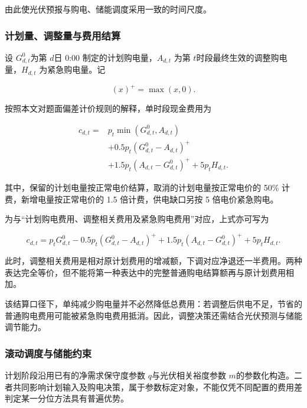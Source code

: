 \documentclass[withoutpreface,bwprint]{cumcmthesis}
\begin{document}
由此使光伏预报与购电、储能调度采用一致的时间尺度。

\subsubsection{计划量、调整量与费用结算}

设 \(G_{d,t}^{0}\)为第 \(d\)日 0:00 制定的计划购电量，\(A_{d,t}\) 为第
\(t\)时段最终生效的调整购电量，\(H_{d,t}\) 为紧急购电量。记

\begin{equation}(x)^{+} = \max\left( x,0 \right).\end{equation}

按照本文对题面偏差计价规则的解释，单时段现金费用为

\begin{equation}\begin{aligned}
c_{d,t} = & p_{t}\min\left( G_{d,t}^{0},A_{d,t} \right) \\
 & + 0.5p_{t}\left( G_{d,t}^{0} - A_{d,t} \right)^{+} \\
 & + 1.5p_{t}\left( A_{d,t} - G_{d,t}^{0} \right)^{+} + 5p_{t}H_{d,t}.
\end{aligned}\end{equation}

其中，保留的计划电量按正常电价结算，取消的计划电量按正常电价的 50\%
计费，新增电量按正常电价的 1.5 倍计费，供电缺口另按 5 倍电价紧急购电。

为与``计划购电费用、调整相关费用及紧急购电费用''对应，上式亦可写为

\begin{equation}c_{d,t} = p_{t}G_{d,t}^{0} - 0.5p_{t}\left( G_{d,t}^{0} - A_{d,t} \right)^{+} + 1.5p_{t}\left( A_{d,t} - G_{d,t}^{0} \right)^{+} + 5p_{t}H_{d,t}.\end{equation}

此时，调整相关费用是相对原计划费用的增减额，下调对应净退还一半费用。两种表达完全等价，但不能将第一种表达中的完整普通购电结算额再与原计划费用相加。

该结算口径下，单纯减少购电量并不必然降低总费用：若调整后供电不足，节省的普通购电费用可能被紧急购电费用抵消。因此，调整决策还需结合光伏预测与储能调节能力。

\subsubsection{滚动调度与储能约束}

计划阶段沿用已有的净需求保守度参数 \(q\)与光伏相关裕度参数
\(m\)的参数化构造。二者共同影响计划输入及购电决策，属于参数标定对象，不能仅凭不同配置的费用差判定某一分位方法具有普遍优势。
\end{document}
